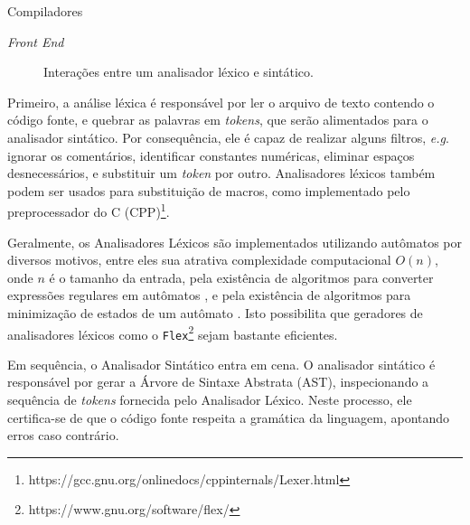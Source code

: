 \begin{section}{Compiladores}
\begin{subsection}{\textit{Front End}}
\begin{figure}
\begin{center}
{
}
\end{center}

\caption{Interações entre um analisador léxico e sintático.}
\label{fig:lexico_sintatico}
\end{figure}

    Primeiro, a análise léxica é responsável por ler o arquivo
de texto contendo o código fonte, e quebrar as palavras em \textit{tokens}, que
serão alimentados para o analisador sintático. Por consequência, ele é capaz de
realizar alguns filtros, \textit{e.g}. ignorar os comentários, identificar constantes
numéricas, eliminar espaços desnecessários, e substituir um \textit{token} por
outro.
Analisadores léxicos também podem ser usados para substituição
de macros, como implementado pelo preprocessador do C
(CPP)\footnote{https://gcc.gnu.org/onlinedocs/cppinternals/Lexer.html}.

Geralmente, os Analisadores Léxicos são implementados utilizando autômatos
por diversos motivos, entre eles sua atrativa complexidade computacional
$O(n)$, onde $n$ é o tamanho da entrada, pela existência de algoritmos
para converter expressões regulares em autômatos \citep{thompson}, e pela
existência de algoritmos para minimização de estados de um autômato
\citep{hopcroft1971n}. Isto possibilita que geradores de analisadores léxicos
como o \texttt{Flex}\footnote{https://www.gnu.org/software/flex/}
sejam bastante eficientes.

    Em sequência, o Analisador Sintático entra em cena. O analisador sintático é
responsável por gerar a Árvore de Sintaxe Abstrata (AST), inspecionando a
sequência de \textit{tokens} fornecida pelo Analisador Léxico. Neste processo,
ele certifica-se de que o código fonte respeita a gramática da linguagem,
apontando erros caso contrário.


\end{subsection}
\end{section}
